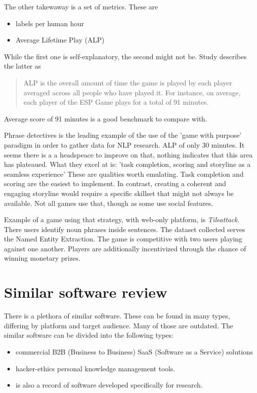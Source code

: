 \documentclass{report}
\begin{document}
{The other takewaway is a set of metrics. These are
\begin{itemize}
  \item labels per human hour
  \item Average Lifetime Play (ALP)
\end{itemize}
While the first one is self-explanatory, the second might not be.
Study describes the latter as 
\begin{quote}
 ALP is the overall amount of time the game is played by each player averaged across all people who have played it. For instance, on average, each player of the ESP Game plays for a total of 91 minutes.
\end{quote}
Average score of 91 minutes is a good benchmark to compare with.

Phrase detectives \cite{poesio_phrase_2013} is the leading example of the use of the 'game with purpose' paradigm in order to gather data for NLP research.
ALP of only 30 minutes. It seems there is a a headspeace to improve on that, nothing indicates that this area has plateaued.
What they excel at is: 'task completion, scoring and storyline as a seamless experience'
These are qualities worth emulating. Task completion and scoring are the easiest to implement. 
In contrast, creating a coherent and engaging storyline would require a specific skillset that might not always be available.
Not all games use that, though as some use social features.

Example of a game using that strategy, with web-only platform, is  \textit{Tileattack}. There users identify noun phrases inside sentences. The dataset collected serves the Named Entity Extraction. The game is competitive with two users playing against one another. Players are additionally incentivized through the chance of winning monetary prizes.
\cite{noauthor_tileattack_nodate}

\section{Similar software review}
There is a plethora of similar software. These can be found in many types, differing by platform and target audience. Many of those are outdated.
The similar software can be divided into the following types:
\begin{itemize}
  \item  commercial B2B (Business to Business) SaaS (Software as a Service) solutions 
  \item  hacker-ethics personal knowledge management tools.
  \item  is also a record of software developed specifically for research.
\end{itemize}

}
\end{document}
